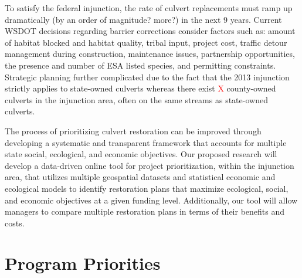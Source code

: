 \documentclass[12pt]{elsarticle}
\begin{document}

To satisfy the federal injunction, the rate of culvert replacements must ramp up dramatically (by an order of magnitude? more?) in the next 9 years. Current WSDOT decisions regarding barrier corrections consider factors such as: amount of habitat blocked and habitat quality, tribal input, project cost, traffic detour management during construction, maintenance issues, partnership opportunities, the presence and number of ESA listed species, and permitting constraints. Strategic planning further complicated due to the fact that the 2013 injunction strictly applies to state-owned culverts whereas there exist \textcolor{red}{X} county-owned culverts in the injunction area, often on the same streams as state-owned culverts.

The process of prioritizing culvert restoration can be improved through developing a systematic and transparent framework that accounts for multiple state social, ecological, and economic objectives. Our proposed research will develop a data-driven online tool for project prioritization, within the injunction area, that utilizes multiple geospatial datasets and statistical economic and ecological models to identify restoration plans that maximize ecological, social, and economic objectives at a given funding level. Additionally, our tool will allow managers to compare multiple restoration plans in terms of their benefits and costs.

\section{Program Priorities} %

\end{document}
